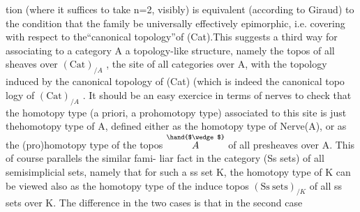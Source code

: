tion (where it suffices to take n=2,  visibly)  is equivalent (according
to Giraud) to the condition that the family be universally effectively
epimorphic,  i.e. covering with respect to the``canonical topology''of
(Cat).This suggests a third way for associating to a \inserted{[small]} category A a
topology-like structure,  namely the topos of all sheaves over
$(\mathrm{Cat})_{/A}$  ,  the site of all categories over A,  with the topology induced
by the canonical topology of (Cat)  (which is indeed the canonical topo\hand{-}%
logy of  $(\mathrm{Cat})_{/A}$ \hand{)}.  It should be an easy exercice in terms of nerves to
check that the homotopy type (a priori,  a prohomotopy type)  associated
to this site is just thehomotopy type of A,  defined either as the
homotopy type of Nerve(A),  or as the (pro)homotopy type of the topos
$\overset{\hand{$\wedge$}}{A}$ of all presheaves over A.  This of course parallels the similar fami-%
liar fact in the category (Ss sets) of all semisimplicial sets,  namely
that for such a ss set K,  the homotopy type of K can be viewed also
as the homotopy type of the induce topos  $(\mathrm{Ss\ sets})_{/K}$ of all ss sets
over K.  The difference in the two cases is that  in the second case
